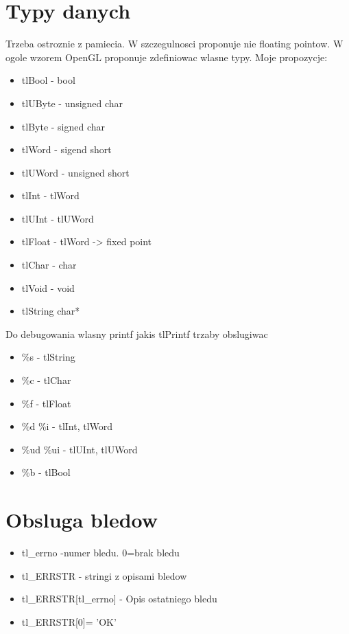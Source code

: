 \documentclass[10pt,a4paper]{article}
\begin{document}
\section{Typy danych}
Trzeba ostroznie z pamiecia. W szczegulnosci proponuje nie floating pointow. W ogole wzorem OpenGL proponuje zdefiniowac wlasne typy. Moje propozycje:\\
\begin{itemize}
	\item tlBool - bool
	\item tlUByte - unsigned char
	\item tlByte - signed char
	\item tlWord - sigend short
	\item tlUWord - unsigned short
	\item tlInt - tlWord
	\item tlUInt - tlUWord
	\item tlFloat - tlWord -> fixed point
	\item tlChar - char
	\item tlVoid - void
	\item tlString char*
\end{itemize}

Do debugowania wlasny printf jakis tlPrintf
trzaby obslugiwac\\
\begin{itemize}
	\item \%s - tlString
	\item \%c - tlChar
	\item \%f - tlFloat
	\item \%d \%i - tlInt, tlWord
	\item \%ud \%ui - tlUInt, tlUWord
	\item \%b - tlBool
\end{itemize}

\section{Obsluga bledow}
\begin{itemize}
	\item tl_errno -numer bledu. 0=brak bledu
	\item tl_ERRSTR - stringi z opisami bledow
	\item tl_ERRSTR[tl_errno] - Opis ostatniego bledu
	\item tl_ERRSTR[0]= 'OK'
\end{itemize}
\end{document}
